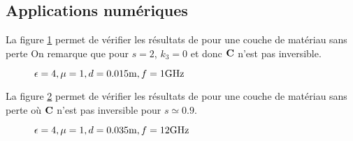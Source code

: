     \subsection{Applications numériques}

        La figure \ref{fig:imp_fourier:plan:hoppe} permet de vérifier les résultats de \cite[p.~33]{hoppe_impedance_1995} pour une couche de matériau sans perte On remarque que pour $s=2$, $k_3 = 0$ et donc $\mathbf{C}$ n'est pas inversible.

        \begin{figure}[!hbt]
            \centering
            \caption[Reproduction résultat Hoppe & Rahmat-Samii p.~33]{$\epsilon = 4, \mu = 1, d=0.015\text{m}, f=1\text{GHz}$}
            \label{fig:imp_fourier:plan:hoppe}
        \end{figure}

        La figure \ref{fig:imp_fourier:plan:soudais} permet de vérifier les résultats de \cite{soudais_3d_2017} pour une couche de matériau sans perte où $\mathbf{C}$ n'est pas inversible pour $s\simeq 0.9$.

        \begin{figure}[!hbt]
            \centering
            \caption[Reproduction résultat P. Soudais]{$\epsilon = 4, \mu = 1, d=0.035\text{m}, f=12\text{GHz}$}
            \label{fig:imp_fourier:plan:soudais}
        \end{figure}
